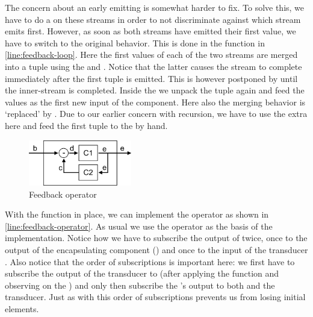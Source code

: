 The concern about an early emitting  is somewhat harder to fix. To solve this, we have to do a  on these streams in order to not discriminate against which stream emits first. However, as soon as both streams have emitted their first value, we have to switch to the original  behavior. This is done in the function  in  \cref{line:feedback-loop}. Here the first values of each of the two streams are merged into a tuple using the  and . Notice that the latter causes the stream to complete immediately after the first tuple is emitted. This  is however postponed by  until the inner-stream is completed. Inside the  we unpack the tuple again and feed the values as the first new input of the  component. Here also the merging behavior is `replaced' by . Due to our earlier concern with recursion, we have to use the extra  here and feed the first tuple to the  by hand.

\begin{figure}[H]
	\begin{center}
		\includegraphics[width=0.4\textwidth]{figures/API-feedback-operator.png}
	\end{center}
	\caption{Feedback operator}
	\label{fig:feedback-operator}
\end{figure}

With the  function in place, we can implement the  operator as shown in  \cref{line:feedback-operator}. As usual we use the  operator as the basis of the implementation. Notice how we have to subscribe the output of  twice, once to the output of the encapsulating component () and once to the input of the transducer . Also notice that the order of subscriptions is important here: we first have to subscribe the output of the transducer to  (after applying the  function and observing on the ) and only then subscribe the 's output to both  and the transducer. Just as with  this order of subscriptions prevents us from losing initial elements.

